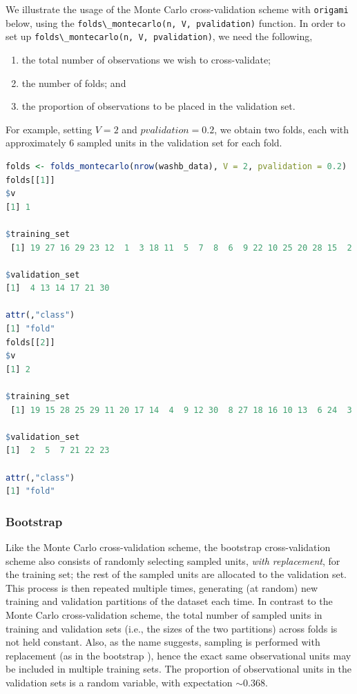 \documentclass[
  12pt, krantz2,
]{krantz}
\newcommand{\passthrough}[1]{#1}
\providecommand{\tightlist}{%
  \setlength{\itemsep}{0pt}\setlength{\parskip}{0pt}}
\newcommand{\1}{\mathbbm{1}}
\theoremstyle{definition}
\theoremstyle{definition}
\theoremstyle{definition}
\theoremstyle{definition}
\theoremstyle{remark}
\begin{document}
We illustrate the usage of the Monte Carlo cross-validation scheme with
\passthrough{\lstinline!origami!} below, using the \passthrough{\lstinline!folds\_montecarlo(n, V, pvalidation)!} function. In
order to set up \passthrough{\lstinline!folds\_montecarlo(n, V, pvalidation)!}, we need the following,

\begin{enumerate}
\def\labelenumi{\arabic{enumi}.}
\tightlist
\item
  the total number of observations we wish to cross-validate;
\item
  the number of folds; and
\item
  the proportion of observations to be placed in the validation set.
\end{enumerate}

For example, setting \(V=2\) and \(pvalidation = 0.2\), we obtain two folds, each
with approximately \(6\) sampled units in the validation set for each fold.

\begin{lstlisting}[language=R]
folds <- folds_montecarlo(nrow(washb_data), V = 2, pvalidation = 0.2)
folds[[1]]
$v
[1] 1

$training_set
 [1] 19 27 16 29 23 12  1  3 18 11  5  7  8  6  9 22 10 25 20 28 15  2 24 26

$validation_set
[1]  4 13 14 17 21 30

attr(,"class")
[1] "fold"
folds[[2]]
$v
[1] 2

$training_set
 [1] 19 15 28 25 29 11 20 17 14  4  9 12 30  8 27 18 16 10 13  6 24  3 26  1

$validation_set
[1]  2  5  7 21 22 23

attr(,"class")
[1] "fold"
\end{lstlisting}

\hypertarget{bootstrap}{%
\subsubsection{Bootstrap}\label{bootstrap}}

Like the Monte Carlo cross-validation scheme, the bootstrap cross-validation
scheme also consists of randomly selecting sampled units, \emph{with replacement},
for the training set; the rest of the sampled units are allocated to the
validation set. This process is then repeated multiple times, generating (at
random) new training and validation partitions of the dataset each time. In
contrast to the Monte Carlo cross-validation scheme, the total number of sampled
units in training and validation sets (i.e., the sizes of the two partitions)
across folds is not held constant. Also, as the name suggests, sampling is
performed with replacement (as in the bootstrap \citep{davison1997bootstrap}), hence
the exact same observational units may be included in multiple training sets.
The proportion of observational units in the validation sets is a random
variable, with expectation \(\sim 0.368\).
\end{document}
